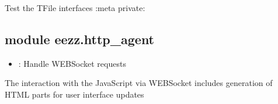 \documentclass[letterpaper,10pt,english]{sphinxmanual}
\begin{document}
\begin{savenotes}
\begin{fulllineitems}

\begin{savenotes}\begin{fulllineitems}
\label{\detokenize{eezz:eezz.filesrv.TFileMode.DECRYPT}}
\pysigstartsignatures
{}
\pysigstopsignatures
\end{fulllineitems}\end{savenotes}


\end{fulllineitems}\end{savenotes}


\begin{savenotes}\begin{fulllineitems}
\label{\detokenize{eezz:eezz.filesrv.test_file_reader}}
\pysigstartsignatures
{}
\pysigstopsignatures
\sphinxAtStartPar
Test the TFile interfaces
:meta private:

\end{fulllineitems}\end{savenotes}



\subsection{module eezz.http\_agent}
\label{\detokenize{eezz:module-eezz.http_agent}}\label{\detokenize{eezz:module-eezz-http-agent}}\begin{itemize}
\item {} 
\sphinxAtStartPar
{}: Handle WEB\sphinxhyphen{}Socket requests

\end{itemize}

\sphinxAtStartPar
The interaction with the JavaScript via WEB\sphinxhyphen{}Socket includes generation of HTML parts for user interface updates
\end{document}
